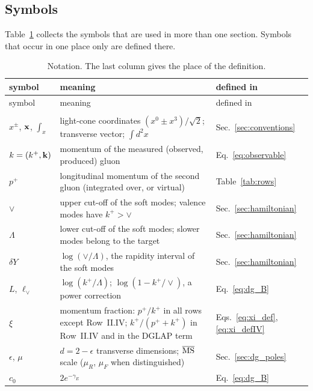 \subsection{Symbols}\label{sec:symbols}

Table~\ref{tab:notation} collects the symbols that are used in more than one section. Symbols that occur in one place only are defined there.

\begingroup
\footnotesize
\renewcommand{\arraystretch}{1.25}
\begin{longtable}{@{}>{\raggedright\arraybackslash}p{}>{\raggedright\arraybackslash}p{}>{\raggedright\arraybackslash}p{}@{}}
\caption{Notation. The last column gives the place of the definition.}\label{tab:notation}\\
\toprule
symbol & meaning & defined in\\
\midrule
\endfirsthead
\toprule
symbol & meaning & defined in\\
\midrule
\endhead
\bottomrule
\endfoot
\multicolumn{3}{@{}l}{\emph{Kinematics and cut-offs}}\\
$x^\pm$, $\mathbf{x}$, $\int_x$ & light-cone coordinates $(x^0\pm x^3)/\sqrt2$; transverse vector; $\int d^2x$ & Sec.~\ref{sec:conventions}\\
$k=(k^+,\mathbf{k})$ & momentum of the measured (observed, produced) gluon & Eq.~\eqref{eq:observable}\\
$p^+$ & longitudinal momentum of the second gluon (integrated over, or virtual) & Table~\ref{tab:rows}\\
$\vee$ & upper cut-off of the soft modes; valence modes have $k^+>\vee$ & Sec.~\ref{sec:hamiltonian}\\
$\Lambda$ & lower cut-off of the soft modes; slower modes belong to the target & Sec.~\ref{sec:hamiltonian}\\
$\delta Y$ & $\log(\vee/\Lambda)$, the rapidity interval of the soft modes & Sec.~\ref{sec:hamiltonian}\\
$L$, $\ell_\vee$ & $\log(k^+/\Lambda)$; $\log(1-k^+/\vee)$, a power correction & Eq.~\eqref{eq:dg_B}\\
$\xi$ & momentum fraction: $p^+/k^+$ in all rows except Row~II.IV; $k^+/(p^++k^+)$ in Row~II.IV and in the DGLAP term & Eqs.~\eqref{eq:xi_def}, \eqref{eq:xi_defIV}\\
$\epsilon$, $\mu$ & $d=2-\epsilon$ transverse dimensions; $\overline{\rm MS}$ scale ($\mu_R$, $\mu_F$ when distinguished) & Sec.~\ref{sec:dg_poles}\\
$c_0$ & $2e^{-\gamma_E}$ & Eq.~\eqref{eq:dg_B}\\[2pt]

\end{longtable}
